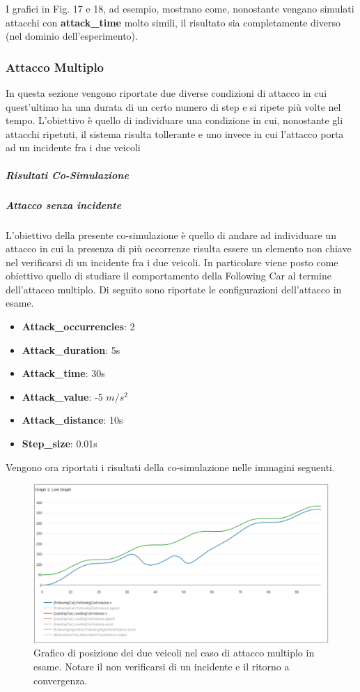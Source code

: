 I grafici in Fig. 17 e 18, ad esempio, mostrano come, nonostante vengano simulati attacchi con \textbf{attack\_time} molto simili, il risultato sia completamente diverso (nel dominio dell'esperimento).
\subsubsection{Attacco Multiplo}
In questa sezione vengono riportate due diverse condizioni di attacco in cui quest'ultimo ha una durata di un certo numero di step e si ripete più volte nel tempo. L'obiettivo è quello di individuare una condizione in cui, nonostante gli attacchi ripetuti, il sistema risulta tollerante e uno invece in cui l'attacco porta ad un incidente fra i due veicoli
\subparagraph{Risultati Co-Simulazione}
\subparagraph{Attacco senza incidente}
L'obiettivo della presente co-simulazione è quello di andare ad individuare un attacco in cui la presenza di più occorrenze risulta essere un elemento non chiave nel verificarsi di un incidente fra i due veicoli. In particolare viene posto come obiettivo quello di studiare il comportamento della Following Car al termine dell'attacco multiplo. Di seguito sono riportate le configurazioni dell'attacco in esame.
\begin{itemize}
	\item \textbf{Attack\_occurrencies}: 2
	\item \textbf{Attack\_duration}: 5s
	\item \textbf{Attack\_time}: 30s
	\item \textbf{Attack\_value}: -5 $m/s^2$
	\item \textbf{Attack\_distance}: 10s
	\item \textbf{Step\_size}: 0.01s
\end{itemize}
Vengono ora riportati i risultati della co-simulazione nelle immagini seguenti.

\begin{figure}[H]
	\centering
	\includegraphics[width=\textwidth]{img/MultiAttackAccelPlotXNoCrash.png}
	\caption{Grafico di posizione dei due veicoli nel caso di attacco multiplo in esame. Notare il non verificarsi di un incidente e il ritorno a convergenza.}
\end{figure}


